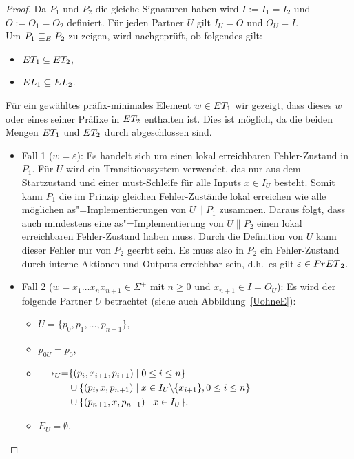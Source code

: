 \begin{proof}
  Da $P_1$ und $P_2$ die gleiche Signaturen haben wird $I:=I_1=I_2$ und
  $O:=O_1=O_2$ definiert. Für jeden Partner $U$ gilt $I_U=O$ und $O_U=I$.\\
  Um $P_1\ERel{}P_2$ zu zeigen, wird nachgeprüft, ob folgendes gilt:
  \begin{itemize}
    \item $\ET _1\subseteq \ET _2$,
    \item $\EL _1\subseteq \EL _2$.
  \end{itemize}
  Für ein gewähltes präfix-minimales Element $w\in\ET _1$ wir gezeigt, dass
  dieses $w$ oder eines seiner Präfixe in $\ET _2$ enthalten ist. Dies ist
  möglich, da die beiden Mengen $\ET _1$ und $\ET _2$ durch \cont{}
  abgeschlossen sind.
  \begin{itemize}
    \item Fall 1 ($w=\varepsilon$): Es handelt sich um einen lokal erreichbaren
      Fehler-Zustand in $P_1$. Für $U$ wird ein Transitionssystem verwendet,
      das nur aus dem Startzustand und einer must-Schleife für alle Inputs
      $x\in I_U$ besteht. Somit kann $P_1$ die im Prinzip gleichen
      Fehler-Zustände lokal erreichen wie alle möglichen as"=Implementierungen
      von $U\|P_1$ zusammen. Daraus folgt, dass auch mindestens eine
      as"=Implementierung von $U\|P_2$ einen lokal erreichbaren Fehler-Zustand
      haben muss. Durch die Definition von $U$ kann dieser Fehler nur von $P_2$
      geerbt sein. Es muss also in $P_2$ ein Fehler-Zustand durch interne
      Aktionen und Outputs erreichbar sein, d.h.\ es gilt $\varepsilon\in
      \PrET{}_2$.
    \item Fall 2 ($w=x_1\dots x_n x_{n+1}\in\Sigma ^+$ mit $n\geq 0$ und
      $x_{n+1}\in I = O_U$): Es wird der folgende Partner $U$ betrachtet (siehe
      auch Abbildung~\ref{UohneE}):
      \begin{itemize}
        \item $U=\{p_0,p_1,\dots ,p_{n+1}\}$,
        \item $p_{0U}=p_0$,
        \item $\begin{aligned}[t]
            \must _U=&\{(p_i,x_{i+1},p_{i+1})\mid  0\leq i\leq n\}\\
            &\cup\{(p_i,x,p_{n+1})\mid  x\in I_U\backslash\{x_{i+1}\}, 0\leq
            i\leq n\}\\
            &\cup\{(p_{n+1},x,p_{n+1})\mid  x\in I_U\}.
        \end{aligned}$
        \item $E_U=\emptyset$,
      \end{itemize}
      \begin{figure} [h!tbp]
      \begin{center}
        \begin{tikzpicture}[->, >=latex',auto,node distance =3cm, semithick]


\end{tikzpicture}
\end{center}
\end{figure}
\end{itemize}
\end{proof}
